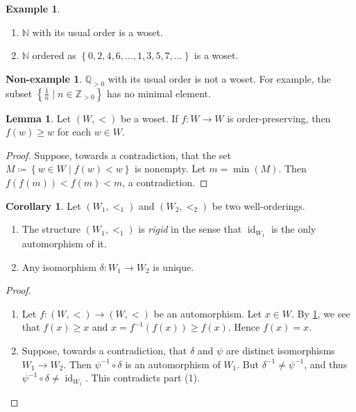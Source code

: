 \documentclass[10pt,letterpaper,cm]{nupset}
\theoremstyle{definition}
\newtheorem{exmp}[definition]{Example}
\newtheorem{non-exmp}[definition]{Non-example}
\theoremstyle{theorem}
\newtheorem{lemma}[definition]{Lemma}
\newtheorem{corollary}[definition]{Corollary}
\theoremstyle{remark}
\newcommand{\N}{\mathbb N}
\newcommand{\Q}{\mathbb Q}
\newcommand{\Z}{\mathbb Z}
\newcommand{\1}{\mathbf{1}}
\newcommand{\0}{\vec 0}
\DeclareMathOperator{\id}{id}
\begin{document}
\begin{exmp} $ $
\begin{enumerate}
\item $\N$ with its usual order is a woset. 
\item $\N$ ordered as $\left\{0, 2, 4, 6, \ldots, 1, 3, 5, 7, \ldots\right\}$ is a woset.
\end{enumerate}
\end{exmp}

\begin{non-exmp}
$\Q_{>0}$ with its usual order is not a woset. For example, the subset $\left\{\frac{1}{n} \mid n \in \Z_{>0}\right\}$ has no minimal element. 
\end{non-exmp}

\begin{lemma}\label{woprop}
Let $\left(W, <\right)$ be a woset. If $f: W \to W$ is order-preserving, then $f(w) \geq w$ for each $w\in W$.
\end{lemma}
\begin{proof}
Suppose, towards a contradiction, that the set $M \coloneqq \left\{w\in W \mid f(w) <w\right\}$ is nonempty. Let $m = \min(M)$. Then $f(f(m))< f(m) < m$, a contradiction. 
\end{proof}

\begin{corollary} Let $\left(W_1, <_1\right)$ and $\left(W_2, <_2\right)$ be two well-orderings. 
\begin{enumerate}[label=(\arabic*)]
\item The structure $\left(W_1, <_1\right)$ is \textit{rigid} in the sense that $\id_{W_1}$ is the only automorphism of it.
\item Any isomorphism $\delta : W_1 \to W_2$ is unique. 
\end{enumerate}
\end{corollary}
\begin{proof} $ $
\begin{enumerate}[label=(\arabic*)]
\item Let $f: \left(W, <\right) \to \left(W,<\right)$ be an automorphism.  Let $x\in W$. By \cref{woprop}, we see that $f(x)\geq x$ and $x = f^{-1}(f(x))\geq f(x)$. Hence $f(x) =x$.
\item Suppose, towards a contradiction, that $\delta$ and $\psi$ are distinct isomorphisms $ W_1\to W_2$. Then $\psi^{-1} \circ \delta$ is an automorphism of $W_1$. But $\delta^{-1} \ne \psi^{-1}$, and thus $\psi^{-1} \circ \delta \ne \id_{W_1}$. This contradicts part (1). 
\end{enumerate}
\end{proof}
\end{document}
